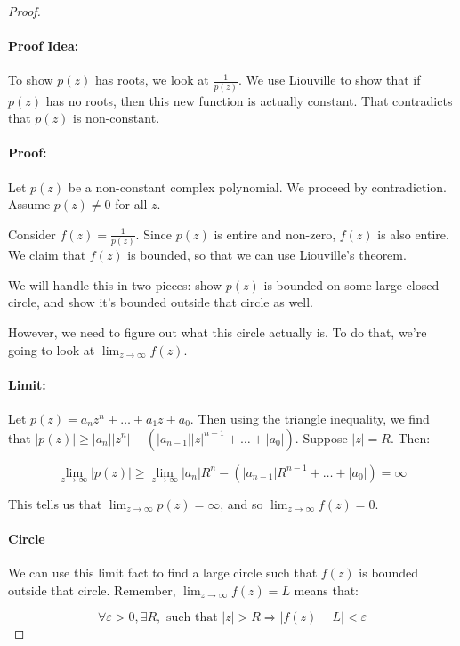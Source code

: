 \begin{proof}~ \paragraph{Proof Idea:} To show $p(z)$ has roots, we look at $\frac{1}{p(z)}$. We use Liouville to show that if $p(z)$ has no roots, then this new function is actually constant. That contradicts that $p(z)$ is non-constant.

\paragraph{Proof:} Let $p(z)$ be a non-constant complex polynomial. We proceed by contradiction. Assume $p(z) \ne 0$ for all $z$.

Consider $f(z) = \frac{1}{p(z)}$. Since $p(z)$ is entire and non-zero, $f(z)$ is also entire. We claim that $f(z)$ is bounded, so that we can use Liouville's theorem.

We will handle this in two pieces: show $p(z)$ is bounded on some large closed circle, and show it's bounded outside that circle as well.

However, we need to figure out what this circle actually is. To do that, we're going to look at $\lim_{z\rightarrow \infty} f(z)$.


\paragraph{Limit:} Let $p(z) = a_nz^n + \dots + a_1z + a_0$. Then using the triangle inequality, we find that $|p(z)| \ge |a_n||z^n| - (|a_{n-1}||z|^{n-1} + \dots + |a_0|)$. Suppose $|z| = R$. Then:

$$\lim_{z\rightarrow \infty} |p(z)| \ge \lim_{z\rightarrow \infty} |a_n|R^n - (|a_{n-1}|R^{n-1} + \dots + |a_0|) = \infty$$

This tells us that $\lim_{z\rightarrow \infty} p(z) = \infty$, and so $\lim_{z\rightarrow \infty} f(z) = 0$.


\paragraph{Circle} We can use this limit fact to find a large circle such that $f(z)$ is bounded outside that circle. Remember, $\lim_{z\rightarrow \infty} f(z) = L$ means that:

$$\forall \varepsilon>0, \exists R, \text{ such that } |z| > R \Rightarrow |f(z) - L| < \varepsilon$$


\end{proof}
